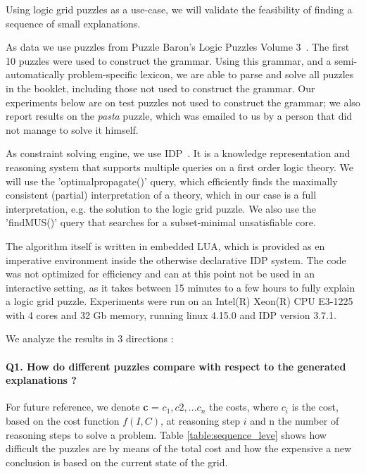 Using logic grid puzzles as a use-case, we will validate the feasibility of finding a sequence of small explanations.

As data we use puzzles from Puzzle Baron’s Logic Puzzles Volume 3~\cite{logigrammen}. The first 10 puzzles were used to construct the grammar. Using this grammar, and a semi-automatically problem-specific lexicon, we are able to parse and solve all puzzles in the booklet, including those not used to construct the grammar. Our experiments below are on test puzzles not used to construct the grammar; we also report results on the \textit{pasta} puzzle, which was emailed to us by a person that did not manage to solve it himself.

As constraint solving engine, we use IDP~\cite{idp}. It is a knowledge representation and reasoning system that supports multiple queries on a first order logic theory. We will use the 'optimalpropagate()' query, which efficiently finds the maximally consistent (partial) interpretation of a theory, which in our case is a full interpretation, e.g. the solution to the logic grid puzzle. We also use the 'findMUS()' query that searches for a subset-minimal unsatisfiable core.

The algorithm itself is written in embedded LUA, which is provided as en imperative environment inside the otherwise declarative IDP system. The code was not optimized for efficiency and can at this point not be used in an interactive setting, as it takes between 15 minutes to a few hours to fully explain a logic grid puzzle. Experiments were run on an Intel(R) Xeon(R) CPU E3-1225 with 4 cores and 32 Gb memory, running linux 4.15.0 and IDP version 3.7.1.


We analyze the results in 3 directions :

\paragraph{Q1. How do different puzzles compare with respect to the generated explanations ?} For future reference, we denote \textbf{c} = $c_1, c2, ...c_n$ the costs, where $c_i$ is the cost, based on the cost function $f(I, C)$, at reasoning step $i$ and n the number of reasoning steps to solve a problem. Table \ref{table:sequence_leve} shows how difficult the puzzles are by means of the total cost and how the expensive a new conclusion is based on the current state of the grid.

